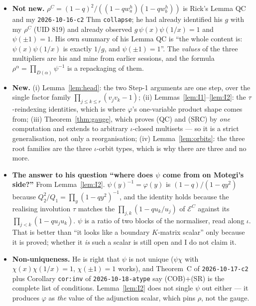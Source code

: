 \documentclass[11pt]{article}
\theoremstyle{definition}
\begin{document}
\begin{itemize}
\item \textbf{Not new.}  $\rho^{C}=(1-q)^2/((1-qw_a^{h})(1-qw_b^{h}))$ is Rick's
  Lemma QC and my \texttt{2026-10-16-c2} Thm \texttt{collapse}; he had already
  identified his $g$ with my $\rho^{C}$ (UID 819) and already observed
  $g\,\psi(x)\psi(1/x)=1$ and $\psi(\pm1)=1$.  His own summary of his Lemma QC is
  ``the whole content is: $\psi(x)\psi(1/x)$ is exactly $1/g$, and
  $\psi(\pm1)=1$''.  The \emph{values} of the three multipliers are his and mine
  from earlier sessions, and the formula
  $\rho^{\alpha}=\prod_{D(\alpha)}\psi^{-1}$ is a repackaging of them.
\item \textbf{New.}  (i) Lemma~\ref{lem:head}: the two Step-1 arguments are one
  step, over the single factor family $\prod_{j\le k\le r}(v_jv_k-1)$;
  (ii) Lemmas~\ref{lem:I1}--\ref{lem:I2}: the $\tau$-reindexing identities, which
  is where $\varphi$'s one-variable product shape comes from;
  (iii) Theorem~\ref{thm:gauge}, which proves (QC) and (SRC) by \emph{one}
  computation and extends to arbitrary $\iota$-closed multisets --- so it is a
  strict generalisation, not only a reorganisation;
  (iv) Lemma~\ref{lem:orbits}: the three root families are the three
  $\iota$-orbit types, which is why there are three and no more.
\item \textbf{The answer to his question ``where does $\psi$ come from on
  Motegi's side?''}  From Lemma~\ref{lem:I2}.  $\psi(y)^{-1}=\varphi(y)$ is
  $(1-q)/(1-qy^2)$ because $Q_2^2/Q_1=\prod_y(1-qy^2)^{-1}$, and the identity
  holds because the realising involution $\tau$ matches the
  $\prod_{j,k}(1-qu_k/u_j)$ of $\mathcal{E}^{C}$ against its
  $\prod_{j<k}(1-qu_ju_k)$.  $\psi$ is a ratio of two blocks of the normaliser,
  read along $\iota$.  That is better than ``it looks like a boundary $K$-matrix
  scalar'' only because it is proved; whether it \emph{is} such a scalar is still
  open and I do not claim it.
\item \textbf{Non-uniqueness.}  He is right that $\psi$ is not unique
  ($\psi\chi$ with $\chi(x)\chi(1/x)=1$, $\chi(\pm1)=1$ works), and
  Theorem~C of \texttt{2026-10-17-c2} plus Corollary \texttt{cor:inv} of
  \texttt{2026-10-18-atype} say (COB)+(SR) is the complete list of conditions.
  Lemma~\ref{lem:I2} does not single $\psi$ out either --- it produces
  $\varphi$ as \emph{the} value of the adjunction scalar, which pins $\rho$, not
  the gauge.
\end{itemize}

\end{document}
